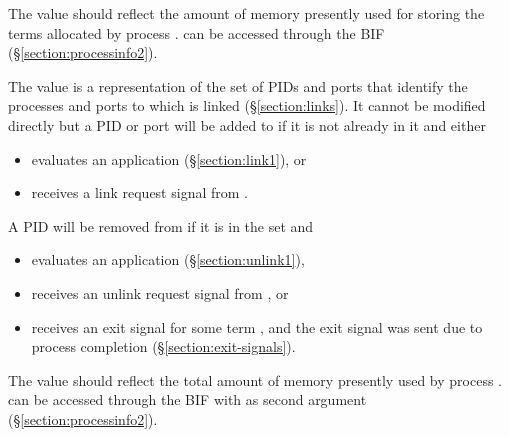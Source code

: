\begin{Lentry}
\item[\T{heap_size[\Z{P}]}]
The value should reflect the amount of memory presently used for storing the terms
allocated by process .
can be accessed through the BIF  (\S\ref{section:processinfo2}).

\item[\T{linked[\Z{P}]}]
The value is a representation of the set of PIDs and ports that identify
the processes and ports to which  is linked
(\S\ref{section:links}).
It cannot be modified directly but a PID or port 
will be added to 
if it is not already in it and either
\begin{itemize}
\item {} evaluates an application 
(\S\ref{section:link1}), or
\item {} receives a link request signal from .
\end{itemize}
A PID  will be removed from  if it is in the set and
\begin{itemize}
\item {} evaluates an application 
(\S\ref{section:unlink1}),
\item {} receives an unlink request signal from , or
\item {} receives an exit signal
 for some term
, and the exit signal was sent due to process completion
(\S\ref{section:exit-signals}).
\end{itemize}

\item[\T{memory_in_use[\Z{P}]}]
The value should reflect the total amount of memory presently used by process .
can be accessed through the BIF  with  as
second argument (\S\ref{section:processinfo2}).


\end{Lentry}
